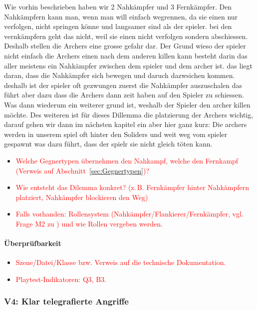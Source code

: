 \documentclass[../Main.tex]{subfiles}
\begin{document}
Wie vorhin beschrieben haben wir 2 Nahkämpfer und 3 Fernkämpfer. Den Nahkämpfern kann man, wenn man will einfach wegrennen, da sie einen nur verfolgen, nicht springen könne und langsamer sind als der spieler. bei den vernkämpfern geht das nicht, weil sie einen nicht verfolgen sondern abschiessen. Deshalb stellen die Archers eine grosse gefahr dar. Der Grund wieso der spieler nicht einfach die Archers einen nach dem anderen killen kann besteht darin das aller meistens ein Nahkämpfer zwischen dem spieler und dem archer ist. das liegt daran, dass die Nahkämpfer sich bewegen und daruch dazwsichen kommen. deshalb ist der spieler oft gezwungen zuerst die Nahkämpfer auszuschalen das führt aber dazu dass die Archers dann zeit haben auf den Spieler zu schiessen. Was dann wiederum ein weiterer grund ist, weshalb der Spieler den archer killen möchte. Des weiteren ist für dieses Dillemma die platzierung der Archers wichtig, darauf gehen wir dann im nächsten kapitel ein aber hier ganz kurz: Die archers werden in unserem spiel oft hinter den Soliders und weit weg vom spieler gespawnt was dazu führt, dass der spielr sie nicht gleich töten kann.

\begin{itemize}[leftmargin=1.5cm]
    \item \textcolor{red}{Welche Gegnertypen übernehmen den Nahkampf, welche den Fernkampf (Verweis auf Abschnitt~\ref{sec:Gegnertypen})?}
    \item \textcolor{red}{Wie entsteht das Dilemma konkret? (z.\,B. Fernkämpfer hinter Nahkämpfern platziert, Nahkämpfer blockieren den Weg)}
    \item \textcolor{red}{Falls vorhanden: Rollensystem (Nahkämpfer/Flankierer/Fernkämpfer, vgl. Frage M2 zu ) und wie Rollen vergeben werden.}
\end{itemize}

\paragraph{Überprüfbarkeit}
\begin{itemize}[leftmargin=1.5cm]
    \item \textcolor{red}{Szene/Datei/Klasse bzw. Verweis auf die technische Dokumentation.}
    \item \textcolor{red}{Playtest-Indikatoren: Q3, B3.}
\end{itemize}

\subsubsection{V4: Klar telegrafierte Angriffe} \label{sec:V4}
\end{document}
